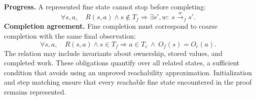 \documentclass[11pt]{article}
\begin{document}
\textbf{Progress.} A represented fine state cannot stop before completing:
\begin{equation}
 \forall s,a,\quad R(s,a)\land s\notin T_f
 \Longrightarrow\exists s',w:\ s\xrightarrow{w}_f s'.
 \label{eq:progress}
\end{equation}
\textbf{Completion agreement.} Fine completion must correspond to coarse completion with the same final observation:
\begin{equation}
 \forall s,a,\quad R(s,a)\land s\in T_f
 \Longrightarrow a\in T_c\ \land\ O_f(s)=O_c(a).
 \label{eq:complete}
\end{equation}
The relation may include invariants about ownership, stored values, and completed work. These obligations quantify over all related states, a sufficient condition that avoids using an unproved reachability approximation. Initialization and step matching ensure that every reachable fine state encountered in the proof remains represented.
\end{document}
